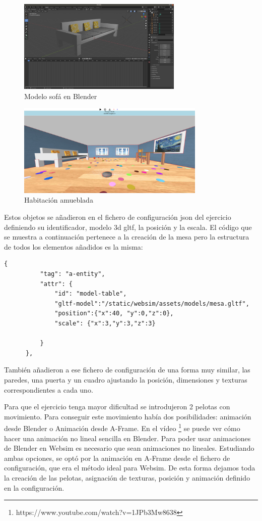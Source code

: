 \begin{figure}[H]
  \centering
 \includegraphics[width=0.7\textwidth]{chapters/images/sofa.png}
  \caption{Modelo sofá en Blender}
\end{figure}

\begin{figure}[H]
\centering
\includegraphics[width=0.8\textwidth, height=0.4\textwidth]{chapters/images/habitacioncon.png}
\caption{Habitación amueblada}
\end{figure}

Estos objetos se añadieron en el fichero de configuración json del ejercicio definiendo su identificador, modelo 3d gltf, la posición y la escala. El código que se muestra a continuación pertenece a la creación de la mesa pero  la estructura  de todos los elementos añadidos es la misma: 
\begin{lstlisting}
{
          "tag": "a-entity",
          "attr": {
              "id": "model-table",
              "gltf-model":"/static/websim/assets/models/mesa.gltf",
              "position":{"x":40, "y":0,"z":0},
              "scale": {"x":3,"y":3,"z":3}

          }
      },
\end{lstlisting}

También añadieron a ese fichero de configuración de una forma muy similar, las paredes, una puerta y un cuadro ajustando la posición, dimensiones y texturas correspondientes a cada uno.

Para que el ejercicio tenga mayor dificultad se introdujeron 2 pelotas con movimiento. Para conseguir este movimiento había dos posibilidades: animación desde Blender o Animación desde A-Frame. 
En el vídeo \footnote{https://www.youtube.com/watch?v=1JPb3Mw8638}  se puede ver cómo hacer una animación no lineal sencilla en Blender. Para poder usar animaciones de Blender en Websim es necesario que sean animaciones no lineales. Estudiando ambas opciones, se optó por la animación en A-Frame desde el fichero de configuración, que era el método ideal para Websim. De esta forma dejamos toda la creación de las pelotas, asignación de texturas, posición y  animación definido en la configuración.

